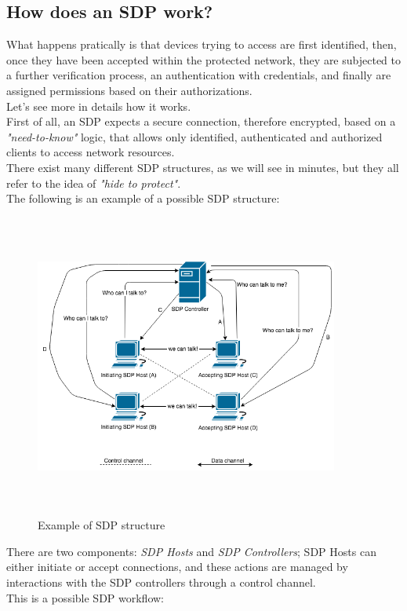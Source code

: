 \documentclass[12pt]{report}
\begin{document}
{\subsection{How does an SDP work?}
\bigskip

What happens pratically is that devices trying to access are first identified, then, once they have been accepted within the protected network, they are subjected to a further verification process, an authentication with credentials, and finally are assigned permissions based on their authorizations.\\
Let's see more in details how it works.\\

First of all, an SDP expects a secure connection, therefore encrypted, based on a \emph{"need-to-know"} logic, that allows only identified, authenticated and authorized clients to access network resources.\\
There exist many different SDP structures, as we will see in minutes, but they all refer to the idea of \emph{"hide to protect"}.\\

The following is an example of a possible SDP structure:

\begin{figure}[H]
\includegraphics[width=10cm,height=10cm,keepaspectratio]{sdp_structure}
\centering
\caption{Example of  SDP structure}
\end{figure}

There are two components: \emph{SDP Hosts} and \emph{SDP Controllers}; SDP Hosts can either initiate or accept connections, and these actions are managed by interactions with the SDP controllers through a control channel.\\
This is a possible SDP workflow:

}
\end{document}
